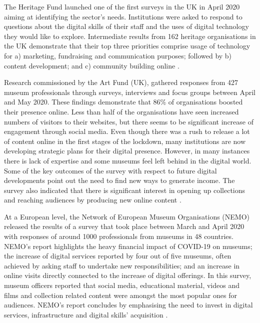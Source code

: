 \documentclass{egpubl}
\begin{document}
The Heritage Fund launched one of the first surveys in the UK in April 2020 aiming at identifying the sector's needs. Institutions were asked to respond to questions about the digital skills of their staff and the uses of digital technology they would like to explore. Intermediate results from 162 heritage organisations in the UK demonstrate that their top three priorities comprise usage of technology for a) marketing, fundraising and communication purposes; followed by b) content development; and c) community building online \cite{HeritageFund2020}.

Research commissioned by the Art Fund (UK), gathered responses from 427 museum professionals through surveys, interviews and focus groups between April and May 2020. These findings demonstrate that 86\% of organisations boosted their presence online. Less than half of the organisations have seen increased numbers of visitors to their websites, but there seems to be significant increase of engagement through social media. Even though there was a rush to release a lot of content online in the first stages of the lockdown, many institutions are now developing strategic plans for their digital presence. However, in many instances there is lack of expertise and some museums feel left behind in the digital world. Some of the key outcomes of the survey with respect to future digital developments point out the need to find new ways to generate income. The survey also indicated that there is significant interest in opening up collections and reaching audiences by producing new online content \cite{WaferHadley2020}.

At a European level, the Network of European Museum Organisations (NEMO) released the results of a survey that took place between March and April 2020 with responses of around 1000 professionals from museums in 48 countries. NEMO's report highlights the heavy financial impact of COVID-19 on museums; the increase of digital services reported by four out of five museums, often achieved by asking staff to undertake new responsibilities; and an increase in online visits directly connected to the increase of digital offerings. In this survey, museum officers reported that social media, educational material, videos and films and collection related content were amongst the most popular ones for audiences. NEMO's report concludes by emphasising the need to invest in digital services, infrastructure and digital skills' acquisition \cite{NetworkofEuropeanMuseumOrganisations20202}.
\end{document}
